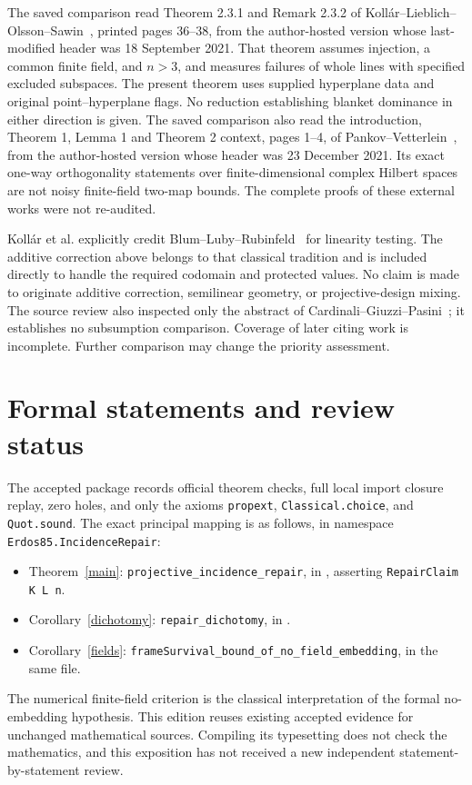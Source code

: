 \documentclass[11pt]{article}
\begin{document}
The saved comparison read Theorem 2.3.1 and Remark 2.3.2 of
Koll\'ar--Lieblich--Olsson--Sawin~\cite{klos}, printed pages 36--38,
from the author-hosted version whose last-modified header was
18 September 2021. That theorem assumes injection, a common finite
field, and $n>3$, and measures failures of whole lines with specified
excluded subspaces. The present theorem uses supplied hyperplane data
and original point--hyperplane flags. No reduction establishing
blanket dominance in either direction is given.
The saved comparison also read the introduction, Theorem 1, Lemma 1
and Theorem 2 context, pages 1--4, of Pankov--Vetterlein~\cite{pv},
from the author-hosted version whose header was 23 December 2021.
Its exact one-way orthogonality statements over finite-dimensional
complex Hilbert spaces are not noisy finite-field two-map bounds.
The complete proofs of these external works were not re-audited.

Koll\'ar et al. explicitly credit Blum--Luby--Rubinfeld~\cite{blr} for
linearity testing. The additive correction above belongs to that
classical tradition and is included directly to handle the required
codomain and protected values. No claim is made to originate additive
correction, semilinear geometry, or projective-design mixing.
The source review also inspected only the abstract of
Cardinali--Giuzzi--Pasini~\cite{cgp}; it establishes no subsumption
comparison. Coverage of later citing work is incomplete. Further
comparison may change the priority assessment.

\section{Formal statements and review status}
The accepted package records official theorem checks, full local import
closure replay, zero holes, and only the axioms \texttt{propext},
\texttt{Classical.choice}, and \texttt{Quot.sound}. The exact principal
mapping is as follows, in namespace \texttt{Erdos85.IncidenceRepair}:
\begin{itemize}
\item Theorem~\ref{main}: \texttt{projective\_incidence\_repair}, in
, asserting
\texttt{RepairClaim K L n}.
\item Corollary~\ref{dichotomy}: \texttt{repair\_dichotomy}, in
.
\item Corollary~\ref{fields}:
{\small\texttt{frameSurvival\_bound\_of\_no\_field\_embedding}}, in the same file.
\end{itemize}
The numerical finite-field criterion is the classical interpretation of the formal
no-embedding hypothesis. This edition reuses existing accepted evidence
for unchanged mathematical sources. Compiling its typesetting does not
check the mathematics, and this exposition has not received a new
independent statement-by-statement review.
\end{document}
